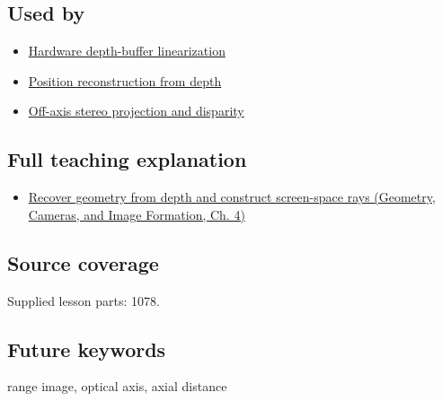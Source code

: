 \subsection{Used by}\label{appendix-cac01ebeeb11-used-by}

\begin{itemize}
\tightlist
\item
  \hyperref[appendix-1bc40b08db4a]{Hardware depth-buffer linearization}
\item
  \hyperref[appendix-2cbf2968e866]{Position reconstruction from depth}
\item
  \hyperref[appendix-0976e86e5b9f]{Off-axis stereo projection and disparity}
\end{itemize}

\subsection{Full teaching explanation}\label{appendix-cac01ebeeb11-full-teaching-explanation}

\begin{itemize}
\tightlist
\item
  \href{../03-Geometry-Cameras-and-Image-Formation/main.pdf\#nameddest=02-foundations-ii-ch035-recover-geometry-from-depth-and-construct-screen-space-rays}{Recover geometry from depth and construct screen-space rays (Geometry, Cameras, and Image Formation, Ch. 4)}
\end{itemize}

\subsection{Source coverage}\label{appendix-cac01ebeeb11-source-coverage}

Supplied lesson parts: 1078.

\subsection{Future keywords}\label{appendix-cac01ebeeb11-future-keywords}

range image, optical axis, axial distance
